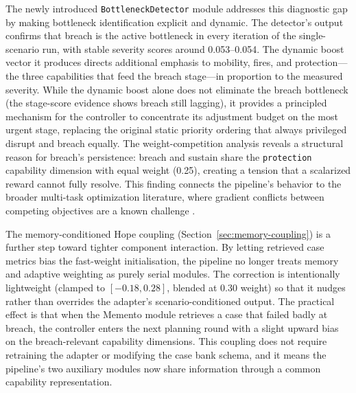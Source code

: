 The newly introduced \texttt{BottleneckDetector} module addresses this diagnostic gap by making bottleneck identification explicit and dynamic. The detector's output confirms that breach is the active bottleneck in every iteration of the single-scenario run, with stable severity scores around 0.053--0.054. The dynamic boost vector it produces directs additional emphasis to mobility, fires, and protection---the three capabilities that feed the breach stage---in proportion to the measured severity. While the dynamic boost alone does not eliminate the breach bottleneck (the stage-score evidence shows breach still lagging), it provides a principled mechanism for the controller to concentrate its adjustment budget on the most urgent stage, replacing the original static priority ordering that always privileged disrupt and breach equally. The weight-competition analysis reveals a structural reason for breach's persistence: breach and sustain share the \texttt{protection} capability dimension with equal weight (0.25), creating a tension that a scalarized reward cannot fully resolve. This finding connects the pipeline's behavior to the broader multi-task optimization literature, where gradient conflicts between competing objectives are a known challenge \citep{yu2020pcgrad}.

The memory-conditioned Hope coupling (Section~\ref{sec:memory-coupling}) is a further step toward tighter component interaction. By letting retrieved case metrics bias the fast-weight initialisation, the pipeline no longer treats memory and adaptive weighting as purely serial modules. The correction is intentionally lightweight (clamped to $[-0.18, 0.28]$, blended at 0.30 weight) so that it nudges rather than overrides the adapter's scenario-conditioned output. The practical effect is that when the Memento module retrieves a case that failed badly at breach, the controller enters the next planning round with a slight upward bias on the breach-relevant capability dimensions. This coupling does not require retraining the adapter or modifying the case bank schema, and it means the pipeline's two auxiliary modules now share information through a common capability representation.

